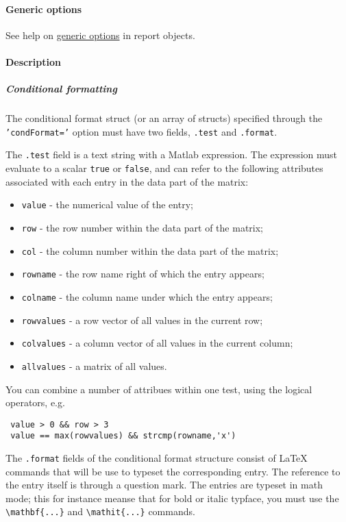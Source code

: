  \paragraph{Generic options}
 
 See help on \href{report/Contents}{generic options} in report objects.
 
 \paragraph{Description}
 
 \subparagraph{Conditional formatting}
 
 The conditional format struct (or an array of structs) specified through
 the \texttt{'condFormat='} option must have two fields, \texttt{.test}
 and \texttt{.format}.
 
 The \texttt{.test} field is a text string with a Matlab expression. The
 expression must evaluate to a scalar \texttt{true} or \texttt{false},
 and can refer to the following attributes associated with each entry in
 the data part of the matrix:
 
 \begin{itemize}
 \item
   \texttt{value} - the numerical value of the entry;
 \item
   \texttt{row} - the row number within the data part of the matrix;
 \item
   \texttt{col} - the column number within the data part of the matrix;
 \item
   \texttt{rowname} - the row name right of which the entry appears;
 \item
   \texttt{colname} - the column name under which the entry appears;
 \item
   \texttt{rowvalues} - a row vector of all values in the current row;
 \item
   \texttt{colvalues} - a column vector of all values in the current
   column;
 \item
   \texttt{allvalues} - a matrix of all values.
 \end{itemize}
 
 You can combine a number of attribues within one test, using the logical
 operators, e.g.
 
 \begin{verbatim}
 value > 0 && row > 3
 value == max(rowvalues) && strcmp(rowname,'x')
 \end{verbatim}
 
 The \texttt{.format} fields of the conditional format structure consist
 of LaTeX commands that will be use to typeset the corresponding entry.
 The reference to the entry itself is through a question mark. The
 entries are typeset in math mode; this for instance meanse that for bold
 or italic typface, you must use the
 \texttt{\textbackslash{}mathbf\{...\}} and
 \texttt{\textbackslash{}mathit\{...\}} commands.
 
